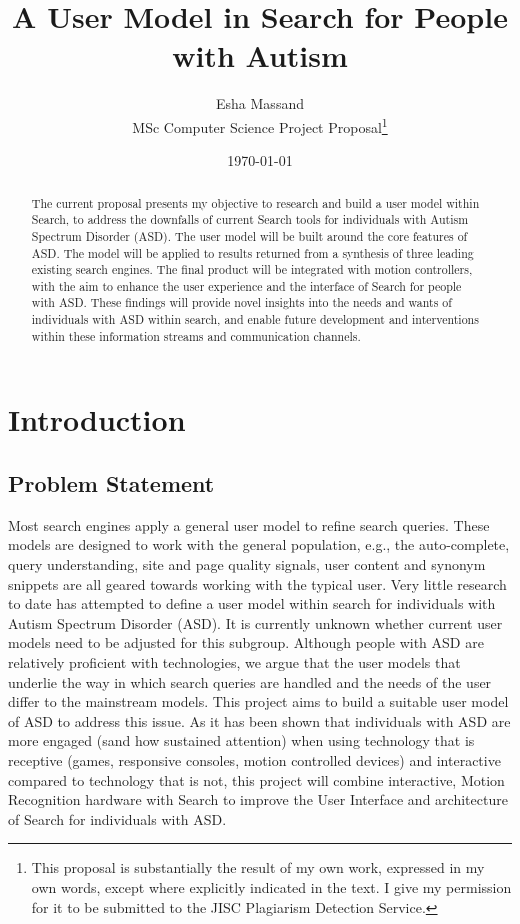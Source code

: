 \documentclass[10pt]{article}
\begin{document}
\title{A User Model in Search for People with Autism}
\author{Esha Massand\\
MSc Computer Science Project Proposal\footnote{This proposal is substantially the result of my own work, expressed in my own words, except where explicitly indicated in the text. I give my permission for it to be submitted to the JISC Plagiarism Detection Service. }}
\date{\today}
\maketitle


\begin{abstract}
The current proposal presents my objective to research and build a user model within Search, to address the downfalls of current Search tools for individuals with Autism Spectrum Disorder (ASD). The user model will be built around the core features of ASD. The model will be applied to results returned from a synthesis of three leading existing search engines. The final product will be integrated with motion controllers, with the aim to enhance the user experience and the interface of Search for people with ASD. These findings will provide novel insights into the needs and wants of individuals with ASD within search, and enable future development and interventions within these information streams and communication channels.
\end{abstract}

\tableofcontents

\section{Introduction}
\subsection{Problem Statement} \label{prob}
Most search engines apply a general user model to refine search queries. These models are designed to work with the general population, e.g., the auto-complete, query understanding, site and page quality signals, user content and synonym snippets are all geared towards working with the typical user. Very little research to date has attempted to define a user model within search for individuals with Autism Spectrum Disorder (ASD). It is currently unknown whether current user models need to be adjusted for this subgroup. Although people with ASD are relatively proficient with technologies, we argue that the user models that underlie the way in which search queries are handled and the needs of the user differ to the mainstream models. This project aims to build a suitable user model of ASD to address this issue.
As it has been shown that individuals with ASD are more engaged (sand how sustained attention) when using technology that is receptive (games, responsive consoles, motion controlled devices) and interactive compared to technology that is not, this project will combine interactive, Motion Recognition hardware with Search to improve the User Interface and architecture of Search for individuals with ASD.
\end{document}
